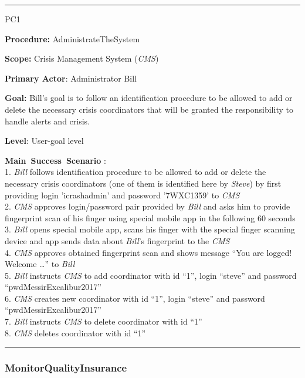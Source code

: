 \hrule
\begin{lyxlist}{PC1}
\small{
\item [\textbf{Procedure:}] AdministrateTheSystem
\item [\textbf{Scope:}] Crisis Management System (\emph{CMS})
\item [\textbf{Primary Actor}:] Administrator Bill
\item [\textbf{Goal:}] Bill’s goal is to follow an
identification procedure to be allowed to add or delete the necessary crisis
coordinators that will be granted the responsibility to handle alerts and crisis.
\item [\textbf{Level}:] User-goal level
\item [\textbf{Main~Success~Scenario}]:\\
1. \emph{Bill} follows identification procedure to be allowed to add or delete
the necessary crisis coordinators (one of them is identified here by
\emph{Steve}) by first providing login 'icrashadmin' and password '7WXC1359'
to \emph{CMS}\\
2. \emph{CMS} approves login/password pair provided by \emph{Bill} and asks
him to provide fingerprint scan of his finger using special mobile app in the
following 60 seconds\\
3. \emph{Bill} opens special mobile app, scans his finger with the special
finger scanning device and app sends data about \emph{Bill}'s fingerprint to
the \emph{CMS}\\
4. \emph{CMS} approves obtained fingerprint scan and shows message ``You are
logged! Welcome \ldots'' to \emph{Bill}\\
5. \emph{Bill} instructs \emph{CMS} to add coordinator with id ``1'',
login ``steve'' and password ``pwdMessirExcalibur2017''\\
6. \emph{CMS} creates new coordinator with id ``1'', login ``steve'' and
password ``pwdMessirExcalibur2017''\\
7. \emph{Bill} instructs \emph{CMS} to delete coordinator with id ``1''\\
8. \emph{CMS} deletes coordinator with id ``1''
}
\end{lyxlist}
\hrule

\subsubsection{MonitorQualityInsurance}

